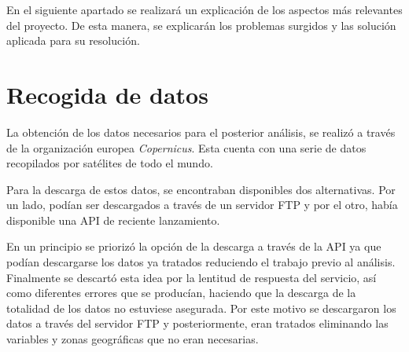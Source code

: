 


\begin{comment}
Este apartado pretende recoger los aspectos más interesantes del desarrollo del proyecto, comentados por los autores del mismo.
Debe incluir desde la exposición del ciclo de vida utilizado, hasta los detalles de mayor relevancia de las fases de análisis, diseño e implementación.
Se busca que no sea una mera operación de copiar y pegar diagramas y extractos del código fuente, sino que realmente se justifiquen los caminos de solución que se han tomado, especialmente aquellos que no sean triviales.
Puede ser el lugar más adecuado para documentar los aspectos más interesantes del diseño y de la implementación, con un mayor hincapié en aspectos tales como el tipo de arquitectura elegido, los índices de las tablas de la base de datos, normalización y desnormalización, distribución en ficheros3, reglas de negocio dentro de las bases de datos (EDVHV GH GDWRV DFWLYDV), aspectos de desarrollo relacionados con el WWW...
Este apartado, debe convertirse en el resumen de la experiencia práctica del proyecto, y por sí mismo justifica que la memoria se convierta en un documento útil, fuente de referencia para los autores, los tutores y futuros alumnos.
\end{comment}

En el siguiente apartado se realizará un explicación de los aspectos más relevantes del proyecto. De esta manera, se explicarán los problemas surgidos y las solución aplicada para su resolución.

\section{Recogida de datos}
La obtención de los datos necesarios para el posterior análisis, se realizó a través de la organización europea \emph{Copernicus}. Esta cuenta con una serie de datos recopilados por satélites de todo el mundo.

Para la descarga de estos datos, se encontraban disponibles dos alternativas. Por un lado, podían ser descargados a través de un servidor FTP y por el otro, había disponible una API de reciente lanzamiento.

En un principio se priorizó la opción de la descarga a través de la API ya que podían descargarse los datos ya tratados reduciendo el trabajo previo al análisis. Finalmente se descartó esta idea por la lentitud de respuesta del servicio, así como diferentes errores que se producían, haciendo que la descarga de la totalidad de los datos no estuviese asegurada. Por este motivo se descargaron los datos a través del servidor FTP y posteriormente, eran tratados eliminando las variables y zonas geográficas que no eran necesarias.

